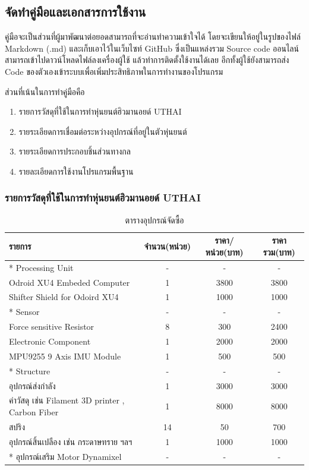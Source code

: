 
\clearpage
\subsection{จัดทำคู่มือและเอกสารการใช้งาน}
คู่มือจะเป็นส่วนที่ผู้มาพัฒนาต่อยอดสามารถที่จะอ่านทำความเข้าใจได้ โดยจะเขียนให้อยู่ในรูปของไฟล์ 
Markdown (.md) และเก็บเอาไว้ในเว็บไซท์ GitHub ซึ่งเป็นแหล่งรวม Source code ออนไลน์
สามารถเข้าไปดาวน์โหลดไฟล์ลงเครื่องผู้ใช้ แล้วทำการติดตั้งใช้งานได้เลย อีกทั้งผู้ใช้ยังสามารถส่ง Code
ของตัวเองเข้าระบบเพื่อเพิ่มประสิทธิภาพในการทำงานของโปรแกรม

ส่วนที่เน้นในการทำคู่มือคือ\vspace{-5mm}
\begin{enumerate}[label=\arabic*, leftmargin=1.5cm]\setlength\itemsep{-0.25em}
	\item รายการวัสดุที่ใช้ในการทำหุ่นยนต์ฮิวมานอยด์ UTHAI
	\item รายระเอียดการเชื่อมต่อระหว่างอุปกรณ์ที่อยู่ในตัวหุ่นยนต์
	\item รายระเอียดการประกอบชิ้นส่วนทางกล
	\item รายละเอียดการใช้งานโปรแกรมพื้นฐาน
\end{enumerate}

\subsubsection{รายการวัสดุที่ใช้ในการทำหุ่นยนต์ฮิวมานอยด์ UTHAI}
\begin{table}[ht]
	\centering
	\begin{tabular}{| l | c | c | c|}
		\hline
		รายการ & จำนวน(หน่วย) & ราคา/หน่วย(บาท) & ราคารวม(บาท) \\
		\hline
		* Processing Unit & - & - & -\\
		Odroid XU4 Embeded Computer & 1 & 3800 & 3800\\
		Shifter Shield for Odoird XU4 & 1 & 1000 & 1000\\
		* Sensor & - & - & -\\
		Force sensitive Resistor & 8 & 300 & 2400\\
		Electronic Component & 1 & 2000 & 2000\\
		MPU9255 9 Axis IMU Module & 1 & 500 & 500\\
		* Structure & - & - & -\\
		อุปกรณ์ส่งกำลัง & 1 & 3000 & 3000\\
		ค่าวัสดุ เช่น Filament 3D printer , Carbon Fiber & 1 & 8000 & 8000\\
		สปริง & 14 & 50 & 700\\
		อุปกรณ์สิ้นเปลือง เช่น กระดาษทราย ฯลฯ & 1 & 1000 & 1000\\
		* อุปกรณ์เสริม Motor Dynamixel & - & - & -\\
		\hline
	\end{tabular}
	\caption{ตารางอุปกรณ์จัดซื้อ}
	\label{tab:matrial_buyer}
\end{table}
\clearpage
